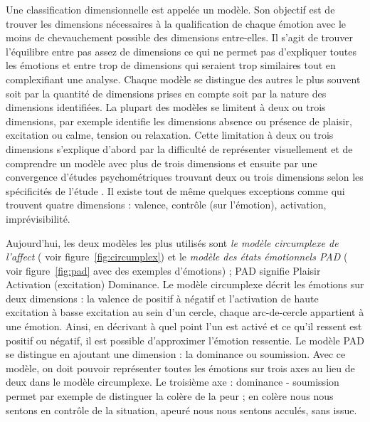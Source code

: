 \documentclass[a4paper,12pt, openany]{book}
\begin{document}
Une classification dimensionnelle est appelée un modèle. Son objectif est de trouver les dimensions nécessaires à la qualification de chaque émotion avec le moins de chevauchement possible des dimensions entre-elles. Il s'agit de trouver l'équilibre entre pas assez de dimensions ce qui ne permet pas d'expliquer toutes les émotions et entre trop de dimensions qui seraient trop similaires tout en complexifiant une analyse. Chaque modèle se distingue des autres le plus souvent soit par la quantité de dimensions prises en compte soit par la nature des dimensions identifiées. La plupart des modèles se limitent à deux ou trois dimensions, par exemple \textcite{wundt1897} identifie les dimensions absence ou présence de plaisir, excitation ou calme, tension ou relaxation. Cette limitation à deux ou trois dimensions s'explique d'abord par la difficulté de représenter visuellement et de comprendre un modèle avec plus de trois dimensions et ensuite par une convergence d'études psychométriques trouvant deux ou trois dimensions selon les spécificités de l'étude \parencites{osgood66, schlosberg54, abelson62, gladstones62, williams65}. Il existe tout de même quelques exceptions comme \textcite{fontaine07} qui trouvent quatre dimensions : valence, contrôle (sur l'émotion), activation, imprévisibilité. \par


Aujourd'hui, les deux modèles les plus utilisés \parencite{wang22} sont \textit{le modèle circumplexe de l'affect} (\textcite{russell80} voir figure~\ref{fig:circumplex}) et le \textit{modèle des états émotionnels PAD} (\textcite{mehrabian74} voir figure~\ref{fig:pad} avec des exemples d'émotions) ; PAD signifie Plaisir Activation (excitation) Dominance. Le modèle circumplexe décrit les émotions sur deux dimensions : la valence de positif à négatif et l'activation de haute excitation à basse excitation au sein d'un cercle, chaque arc-de-cercle appartient à une émotion. Ainsi, en décrivant à quel point l'un est activé et ce qu'il ressent est positif ou négatif, il est possible d'approximer l'émotion ressentie. Le modèle PAD se distingue en ajoutant une dimension : la dominance ou soumission. Avec ce modèle, on doit pouvoir représenter toutes les émotions sur trois axes au lieu de deux dans le modèle circumplexe. Le troisième axe : dominance - soumission permet par exemple de distinguer la colère de la peur ; en colère nous nous sentons en contrôle de la situation, apeuré nous nous sentons acculés, sans issue. \par 
\end{document}
